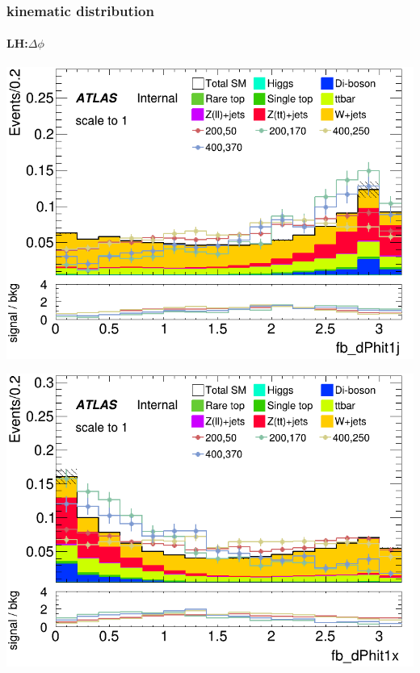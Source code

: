 \documentclass[usenames,dvipsnames]{beamer}
\begin{document}
\begin{frame}
  \frametitle{kinematic distribution}
  \framesubtitle{LH:$\Delta\phi$}
    \begin{minipage}{0.32\textwidth}
        \centering
        \includegraphics[width=\textwidth]{graphics/LH_met_sig/LH_fb_dPhit1j_norm.png}
    \end{minipage}
    \hfill
    \begin{minipage}{0.32\textwidth}
        \centering
        \includegraphics[width=\textwidth]{graphics/LH_met_sig/LH_fb_dPhit1x_norm.png}
    \end{minipage}
    \hfill
    \begin{minipage}{0.32\textwidth}
        \centering

\end{minipage}
\end{frame}
\end{document}
